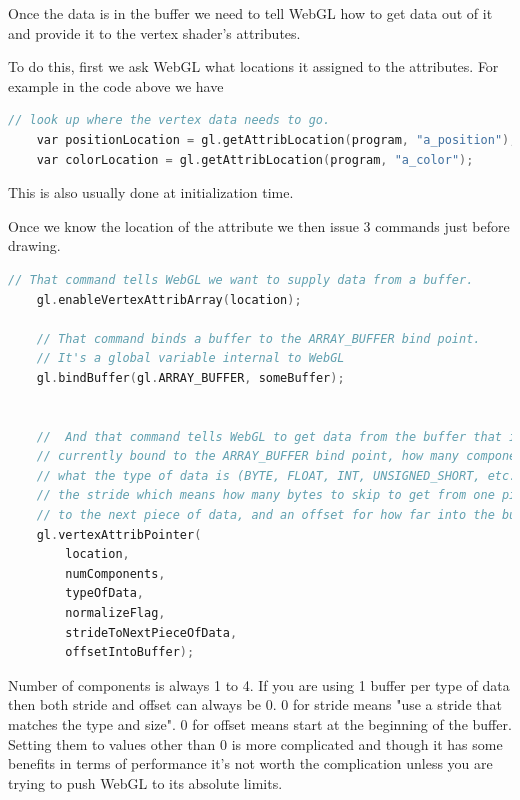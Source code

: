 Once the data is in the buffer we need to tell WebGL how to get data out of it and provide it to the vertex shader's attributes.

To do this, first we ask WebGL what locations it assigned to the attributes. For example in the code above we have
\begin{lstlisting}[language=c]
    // look up where the vertex data needs to go.
    var positionLocation = gl.getAttribLocation(program, "a_position");
    var colorLocation = gl.getAttribLocation(program, "a_color");
\end{lstlisting}
This is also usually done at initialization time.

Once we know the location of the attribute we then issue 3 commands just before drawing.
\begin{lstlisting}[language=c]
    // That command tells WebGL we want to supply data from a buffer.
    gl.enableVertexAttribArray(location);

    // That command binds a buffer to the ARRAY_BUFFER bind point. 
    // It's a global variable internal to WebGL
    gl.bindBuffer(gl.ARRAY_BUFFER, someBuffer);


    //  And that command tells WebGL to get data from the buffer that is 
    // currently bound to the ARRAY_BUFFER bind point, how many components per vertex (1 - 4), 
    // what the type of data is (BYTE, FLOAT, INT, UNSIGNED_SHORT, etc...), 
    // the stride which means how many bytes to skip to get from one piece of data 
    // to the next piece of data, and an offset for how far into the buffer our data is.
    gl.vertexAttribPointer(
        location,
        numComponents,
        typeOfData,
        normalizeFlag,
        strideToNextPieceOfData,
        offsetIntoBuffer);
\end{lstlisting}

Number of components is always 1 to 4. If you are using 1 buffer per type of data then both stride and offset can always be 0. 0 for stride means "use a stride that matches the type and size". 0 for offset means start at the beginning of the buffer. Setting them to values other than 0 is more complicated and though it has some benefits in terms of performance it's not worth the complication unless you are trying to push WebGL to its absolute limits.
